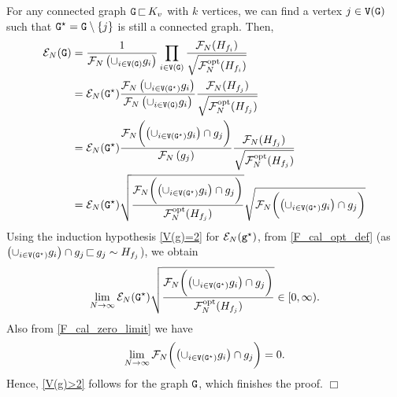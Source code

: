 \documentclass[11pt,reqno]{amsart}
\numberwithin{equation}{section}
\newcommand{\QED}{\hfill $\Box$}
\begin{document}
For any connected graph ${\tt G}{\,\sqsubset\,} K_v$ with $k$ vertices, we can find a vertex $j\in{\tt V}({\tt G})$ such that ${\tt G}^{\star} = {\tt G}\setminus\{j\}$ is still a connected graph. Then, 
\begin{align*}
    \mathcal{E}_N({\tt G}) &= \frac{1}{\mathcal{F}_N\left(\cup_{i\in{\tt V}({\tt G})} g_i\right)}\prod_{i\in{\tt V}({\tt G})}\frac{\mathcal{F}_N({H}_{f_i})}{\sqrt{\mathcal{F}_N^{\rm{opt}}({H}_{f_i})}}\\
    &=\mathcal{E}_N({\tt G}^{\star})\frac{\mathcal{F}_N\left(\cup_{i\in{\tt V}({\tt G}^{\star})} g_i\right)}{\mathcal{F}_N\left(\cup_{i\in{\tt V}({\tt G})} g_i\right)}\frac{\mathcal{F}_N({H}_{f_j})}{\sqrt{\mathcal{F}_N^{\rm{opt}}({H}_{f_j})}}\\
    &=\mathcal{E}_N({\tt G}^{\star})\frac{\mathcal{F}_N\biggl(\bigl(\cup_{i\in{\tt V}({\tt G}^{\star})} g_i\bigr) \cap g_j\biggr)}{\mathcal{F}_N\left(g_j\right)}\frac{\mathcal{F}_N({H}_{f_j})}{\sqrt{\mathcal{F}_N^{\rm{opt}}({H}_{f_j})}}\\
    &=\mathcal{E}_N({\tt G}^{\star})\sqrt{\frac{\mathcal{F}_N\biggl(\bigl(\cup_{i\in{\tt V}({\tt G}^{\star})} g_i\bigr) \cap g_j\biggr)}{\mathcal{F}_N^{\rm{opt}}({H}_{f_j})}}\sqrt{\mathcal{F}_N\biggl(\bigl(\cup_{i\in{\tt V}({\tt G}^{\star})} g_i\bigr) \cap g_j\biggr)}
\end{align*}
{Using the induction hypothesis \eqref{V(g)=2} for $\mathcal{E}_N({\tt g}^{\star})$}, from \eqref{F_cal_opt_def} (as $\bigl(\cup_{i\in{\tt V}({\tt G}^{\star})} g_i\bigr) \cap g_j{\,\sqsubset\,} g_j\sim {H}_{f_j}$), we obtain
\begin{align*}
    \lim_{N\to\infty}\mathcal{E}_N({\tt G}^{\star})\sqrt{\frac{\mathcal{F}_N\biggl(\bigl(\cup_{i\in{\tt V}({\tt G}^{\star})} g_i\bigr) \cap g_j\biggr)}{\mathcal{F}_N^{\rm{opt}}({H}_{f_j})}}\in[0,\infty).
\end{align*}
Also from \eqref{F_cal_zero_limit} we have
\begin{align*}
    \lim_{N\to\infty}\mathcal{F}_N\biggl(\bigl(\cup_{i\in{\tt V}({\tt G}^{\star})} g_i\bigr) \cap g_j\biggr) = 0.
\end{align*}
Hence, \eqref{V(g)>2} follows for the graph ${\tt G}$, which finishes the proof.
\QED

\medskip
\end{document}
